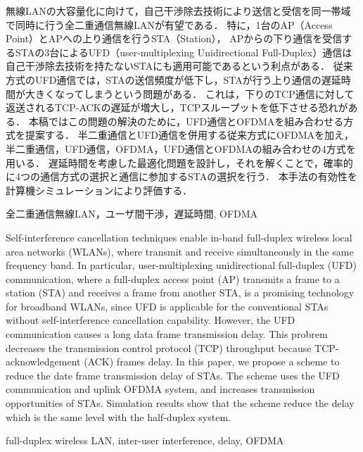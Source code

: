 \documentclass[technicalreport]{ieicej}
\begin{document}
\begin{jabstract}
	無線LANの大容量化に向けて，自己干渉除去技術により送信と受信を同一帯域で同時に行う全二重通信無線LANが有望である．
	特に，1台のAP（Access Point）とAPへの上り通信を行うSTA（Station），
	APからの下り通信を受信するSTAの3台によるUFD（user-multiplexing Unidirectional Full-Duplex）通信は自己干渉除去技術を持たないSTAにも適用可能であるという利点がある．
	従来方式のUFD通信では，STAの送信頻度が低下し，STAが行う上り通信の遅延時間が大きくなってしまうという問題がある．
	これは，下りのTCP通信に対して返送されるTCP-ACKの遅延が増大し，TCPスループットを低下させる恐れがある．
	本稿ではこの問題の解決のために，UFD通信とOFDMAを組み合わせる方式を提案する．
	半二重通信とUFD通信を併用する従来方式にOFDMAを加え，半二重通信，UFD通信，OFDMA，UFD通信とOFDMAの組み合わせの4方式を用いる．
	遅延時間を考慮した最適化問題を設計し，それを解くことで，確率的に4つの通信方式の選択と通信に参加するSTAの選択を行う．
	本手法の有効性を計算機シミュレーションにより評価する．
\end{jabstract}
\begin{jkeyword}
	全二重通信無線LAN，ユーザ間干渉，遅延時間, OFDMA
\end{jkeyword}
\begin{eabstract}
	Self-interference cancellation techniques enable in-band full-duplex wireless local area networks (WLANs), where transmit and receive simultaneously in the same frequency band.
	In particular, user-multiplexing unidirectional full-duplex (UFD) communication, where a full-duplex access point (AP) transmits a frame to a station (STA) and receives a frame from another STA, is a promising technology for broadband WLANs, since UFD is applicable for the conventional STAs without self-interference cancellation capability.
	However, the UFD communication causes a long data frame transmission delay.
	This probrem decreases the transmission control protocol (TCP) throughput because TCP-acknowledgement (ACK) frames delay.
	In this paper, we propose a scheme to reduce the date frame transmission delay of STAs.
	The scheme uses the UFD communication and uplink OFDMA system, and increases transmission opportunities of STAs.
	Simulation results show that the scheme reduce the delay which is the same level with the half-duplex system.

\end{eabstract}
\begin{ekeyword}
	full-duplex wireless LAN, inter-user interference, delay, OFDMA
\end{ekeyword}
\end{document}
